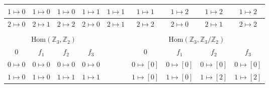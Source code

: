 \begin{counterexample}
\begin{table}[H]
\begin{tabular}{ccccccccc}
        \multicolumn{1}{|c|}{$1\mapsto 0$} & \multicolumn{1}{c|}{$1\mapsto 0$} & \multicolumn{1}{c|}{$1\mapsto 0$} & \multicolumn{1}{c|}{$1\mapsto 1$} & \multicolumn{1}{c|}{$1\mapsto 1$} & \multicolumn{1}{c|}{$1\mapsto 1$}   & \multicolumn{1}{c|}{$1\mapsto 2$}   & \multicolumn{1}{c|}{$1\mapsto 2$}   & \multicolumn{1}{c|}{$1\mapsto 2$}   \\ \hline
        \multicolumn{1}{|c|}{$2\mapsto 0$} & \multicolumn{1}{c|}{$2\mapsto 1$} & \multicolumn{1}{c|}{$2\mapsto 2$} & \multicolumn{1}{c|}{$2\mapsto 0$} & \multicolumn{1}{c|}{$2\mapsto 1$} & \multicolumn{1}{c|}{$2\mapsto 2$}   & \multicolumn{1}{c|}{$2\mapsto 0$}   & \multicolumn{1}{c|}{$2\mapsto 1$}   & \multicolumn{1}{c|}{$2\mapsto 2$}   \\ \hline
                                           &                                   &                                   &                                   &                                   &                                     &                                     &                                     &                                     \\ \cline{1-4} \cline{6-9} 
        \multicolumn{4}{|c|}{$\text{Hom}(\mathbb{Z}_3,\mathbb{Z}_2)$}                                                                                  & \multicolumn{1}{c|}{}             & \multicolumn{4}{c|}{$\text{Hom}(\mathbb{Z}_3,\mathbb{Z}_3/\mathbb{Z}_2)$}                                                                             \\ \cline{1-4} \cline{6-9} 
        \multicolumn{1}{|c|}{$0$}          & \multicolumn{1}{c|}{$f_1$}        & \multicolumn{1}{c|}{$f_2$}        & \multicolumn{1}{c|}{$f_3$}        & \multicolumn{1}{c|}{}             & \multicolumn{1}{c|}{$0$}            & \multicolumn{1}{c|}{$f_1$}          & \multicolumn{1}{c|}{$f_2$}          & \multicolumn{1}{c|}{$f_3$}          \\ \cline{1-4} \cline{6-9} 
        \multicolumn{1}{|c|}{$0\mapsto 0$} & \multicolumn{1}{c|}{$0\mapsto 0$} & \multicolumn{1}{c|}{$0\mapsto 0$} & \multicolumn{1}{c|}{$0\mapsto 0$} & \multicolumn{1}{c|}{}             & \multicolumn{1}{c|}{$0\mapsto [0]$} & \multicolumn{1}{c|}{$0\mapsto [0]$} & \multicolumn{1}{c|}{$0\mapsto [0]$} & \multicolumn{1}{c|}{$0\mapsto [0]$} \\ \cline{1-4} \cline{6-9} 
        \multicolumn{1}{|c|}{$1\mapsto 0$} & \multicolumn{1}{c|}{$1\mapsto 0$} & \multicolumn{1}{c|}{$1\mapsto 1$} & \multicolumn{1}{c|}{$1\mapsto 1$} & \multicolumn{1}{c|}{}             & \multicolumn{1}{c|}{$1\mapsto [0]$} & \multicolumn{1}{c|}{$1\mapsto [0]$} & \multicolumn{1}{c|}{$1\mapsto [2]$} & \multicolumn{1}{c|}{$1\mapsto [2]$} \\ \cline{1-4} \cline{6-9} 

\end{tabular}
\end{table}
\end{counterexample}
